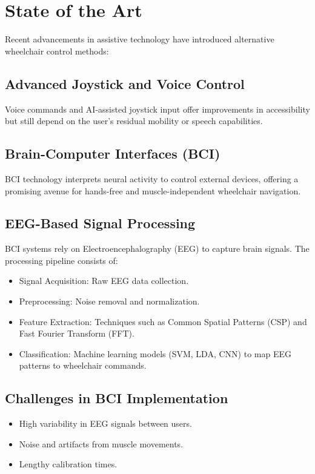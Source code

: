 \documentclass[a4paper]{article}
\begin{document}
\section{State of the Art}

Recent advancements in assistive technology have introduced alternative wheelchair
control methods:

\subsection{Advanced Joystick and Voice Control}
Voice commands and AI-assisted joystick input offer improvements in accessibility
but still depend on the user's residual mobility or speech capabilities.

\subsection{Brain-Computer Interfaces (BCI)}
BCI technology interprets neural activity to control external devices,
offering a promising avenue for hands-free and muscle-independent wheelchair navigation.

\subsection{EEG-Based Signal Processing}
BCI systems rely on Electroencephalography (EEG) to capture brain signals.
The processing pipeline consists of:
\begin{itemize}
    \item Signal Acquisition: Raw EEG data collection.
    \item Preprocessing: Noise removal and normalization.
    \item Feature Extraction: Techniques such as Common Spatial Patterns (CSP) and Fast Fourier Transform (FFT).
    \item Classification: Machine learning models (SVM, LDA, CNN) to map EEG patterns to wheelchair commands.
\end{itemize}

\subsection{Challenges in BCI Implementation}
\begin{itemize}
    \item High variability in EEG signals between users.
    \item Noise and artifacts from muscle movements.
    \item Lengthy calibration times.
\end{itemize}
\end{document}
